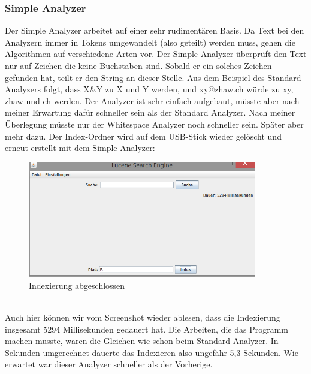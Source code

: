 \documentclass[12pt,a4paper,ngerman]{report}
\begin{document}
\subsubsection{Simple Analyzer}
Der Simple Analyzer arbeitet auf einer sehr rudimentären Basis. Da Text bei den Analyzern immer in Tokens umgewandelt (also geteilt) werden muss, gehen die Algorithmen auf verschiedene Arten vor. Der Simple Analyzer überprüft den Text nur auf Zeichen die keine Buchstaben sind. Sobald er ein solches Zeichen gefunden hat, teilt er den String an dieser Stelle. Aus dem Beispiel des Standard Analyzers folgt, dass X\&Y zu X und Y werden, und xy@zhaw.ch würde zu xy, zhaw und ch werden. Der Analyzer ist sehr einfach aufgebaut, müsste aber nach meiner Erwartung dafür schneller sein als der Standard Analyzer. Nach meiner Überlegung müsste nur der Whitespace Analyzer noch schneller sein. Später aber mehr dazu.
\newpage
Der Index-Ordner wird auf dem USB-Stick wieder gelöscht und erneut erstellt mit dem Simple Analyzer:
\begin{figure}[h!]
\centering
\includegraphics[width=10cm]{img/simple-analyzer-index.png}
\caption{Indexierung abgeschlossen\protect\footnotemark}
\end{figure}
\\
Auch hier können wir vom Screenshot wieder ablesen, dass die Indexierung insgesamt 5294 Millisekunden gedauert hat. Die Arbeiten, die das Programm machen musste, waren die Gleichen wie schon beim Standard Analyzer. In Sekunden umgerechnet dauerte das Indexieren also ungefähr 5,3 Sekunden. Wie erwartet war dieser Analyzer schneller als der Vorherige.
\end{document}
